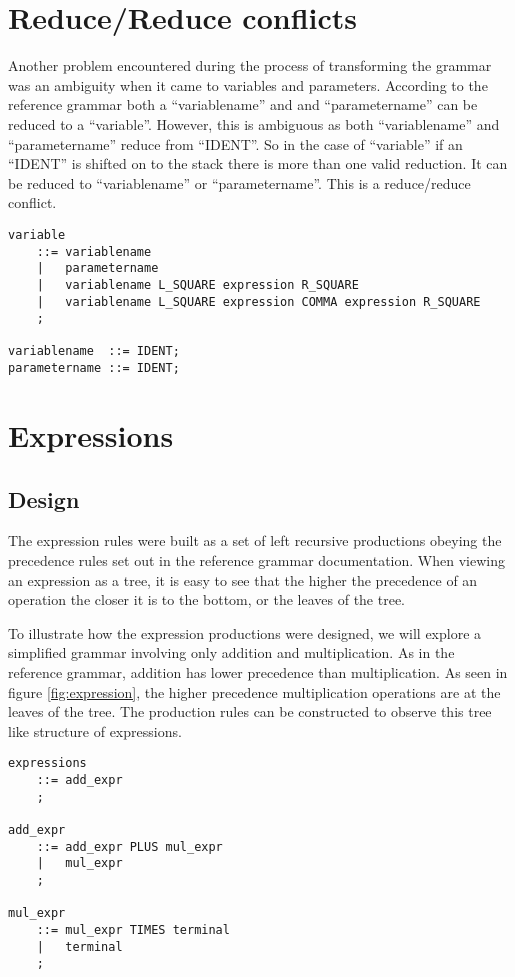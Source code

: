 \documentclass[oneside]{amsart}
\theoremstyle{definition}
\theoremstyle{remark}
\numberwithin{equation}{section}
\begin{document}
\newpage

\section{Reduce/Reduce conflicts}
Another problem encountered during the process of transforming the grammar was an ambiguity when it
came to variables and parameters. According to the reference grammar both a ``variablename'' and
and ``parametername'' can be reduced to a ``variable''. However, this is ambiguous as both
``variablename'' and ``parametername'' reduce from ``IDENT''. So in the case of ``variable'' if
an ``IDENT'' is shifted on to the stack there is more than one valid reduction. It can be reduced to
``variablename'' or ``parametername''. This is a reduce/reduce conflict.

\begin{lstlisting}
variable
    ::= variablename
    |   parametername
    |   variablename L_SQUARE expression R_SQUARE
    |   variablename L_SQUARE expression COMMA expression R_SQUARE
    ;

variablename  ::= IDENT;
parametername ::= IDENT;
\end{lstlisting}


\lstset{numbers=left}
\section{Expressions}
\subsection{Design}
The expression rules were built as a set of left recursive productions obeying the precedence rules
set out in the reference grammar documentation. When viewing an expression as a tree, it is easy to
see that the higher the precedence of an operation the closer it is to the bottom, or the leaves of
the tree.



To illustrate how the expression productions were designed, we will explore a simplified grammar
involving only addition and multiplication. As in the reference grammar, addition has lower
precedence than multiplication. As seen in figure \ref{fig:expression}, the higher precedence
multiplication operations are at the leaves of the tree. The production rules can be constructed
to observe this tree like structure of expressions.

\begin{lstlisting}
expressions
    ::= add_expr
    ;

add_expr
    ::= add_expr PLUS mul_expr
    |   mul_expr
    ;

mul_expr
    ::= mul_expr TIMES terminal
    |   terminal
    ;
\end{lstlisting}
\end{document}
